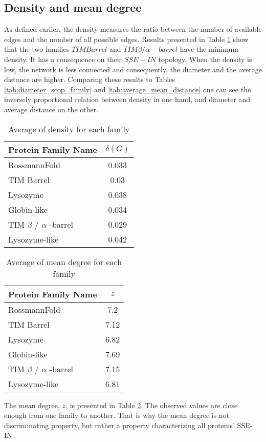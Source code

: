 \subsection{Density and mean degree}
As defined earlier, the density measures the ratio between the number of available edges and the number of all possible edges. Results presented in Table \ref{tab:average_density} show that the two families $TIM Barrel$ and $TIM \beta/\alpha -barrel$ have the minimum density. It has a consequence on their $SSE-IN$ topology. When the density is low, the network is less connected and consequently, the diameter and the average distance are higher. Comparing these results to Tables \ref{tab:diameter_scop_family} and \ref{tab:average_mean_distance} one can see the inversely proportional relation between density in one hand, and diameter and average distance on the other.
\begin{table}
\centering
\begin {tabular}{ | l | c |}
\hline
Protein Family Name & $\delta (G)$ \\ \hline
RossmannFold & 0.033 \\ \hline
TIM Barrel & 0.03 \\ \hline
Lysozyme & 0.038 \\ \hline
\hline
Globin-like & 0.034 \\ \hline
TIM $\beta$ / $\alpha$ -barrel & 0.029 \\ \hline
Lysozyme-like & 0.042 \\ \hline
\end {tabular}
\caption {Average of density for each family}
\label {tab:average_density}
\end{table}
\begin{table}
\centering
\begin {tabular}{ | l | c |}
\hline
Protein Family Name & $z$ \\ \hline
RossmannFold & 7.2 \\ \hline
TIM Barrel & 7.12 \\ \hline
Lysozyme & 6.82 \\ \hline
\hline
Globin-like & 7.69 \\ \hline
TIM $\beta$ / $\alpha$ -barrel & 7.15 \\ \hline
Lysozyme-like & 6.81 \\ \hline
\end {tabular}
\caption {Average of mean degree for each family}
\label {tab:average_mean_degree}
\end{table}
The mean degree, $z$, is presented in Table \ref{tab:average_mean_degree}. The observed values are close enough from one family to another. That is why the mean degree is not discriminating property, but rather a property characterizing all proteins' SSE-IN.

